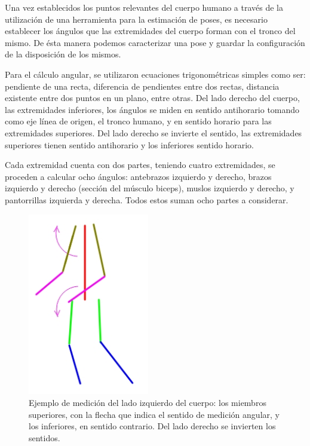 \documentclass[a4paper,12pt,oneside,spanish]{book}
\begin{document}
Una vez establecidos los puntos relevantes del cuerpo humano a través de la utilización de una herramienta para la estimación de poses, es necesario establecer los ángulos que las extremidades del cuerpo forman con el tronco del mismo. De ésta manera podemos caracterizar una pose y guardar la configuración de la disposición de los mismos.\par 

Para el cálculo angular, se utilizaron ecuaciones trigonométricas simples como ser: pendiente de una recta, diferencia de pendientes entre dos rectas, distancia existente entre dos puntos en un plano, entre otras. Del lado derecho del cuerpo, las extremidades inferiores, los ángulos se miden en sentido antihorario tomando como eje línea de origen, el tronco humano, y en sentido horario para las extremidades superiores. Del lado derecho se invierte el sentido, las extremidades superiores tienen sentido antihorario y los inferiores sentido horario.\par

Cada extremidad cuenta con dos partes, teniendo cuatro extremidades, se proceden a calcular ocho ángulos: antebrazos izquierdo y derecho, brazos izquierdo y derecho (sección del músculo biceps), muslos izquierdo y derecho, y pantorrillas izquierda y derecha. Todos estos suman ocho partes a considerar.\par

\begin{figure}[h!]
	\includegraphics[width=150pt]{Imagenes/pose6.jpg}
	\centering	
	\caption{Ejemplo de medición del lado izquierdo del cuerpo: los miembros superiores, con la flecha que indica el sentido de medición angular, y los inferiores, en sentido contrario. Del lado derecho se invierten los sentidos.}
	\label{fig:pose5}
\end{figure}
\end{document}
